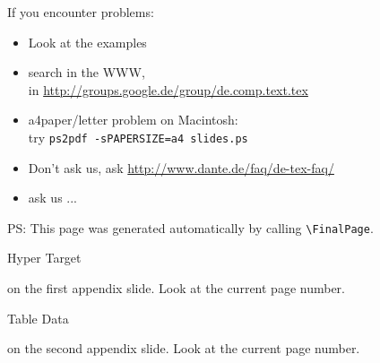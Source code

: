 \documentclass[11pt, a4paper, landscape]{article}
\begin{document}
\NewPage{} 
\begin{block}
  If you encounter problems:
  \begin{itemize}
  \item Look at the examples
  \item search in the WWW,\\ 
    \eg in \url{http://groups.google.de/group/de.comp.text.tex}
  \item a4paper/letter problem on Macintosh:\\ 
    try \texttt{ps2pdf -sPAPERSIZE=a4 slides.ps}
  \item Don't ask us, ask \url{http://www.dante.de/faq/de-tex-faq/}
  \item ask us ...
  \end{itemize}
\end{block}


\FinalPage
\vfill 
\centerline{\footnotesize PS: This page was generated automatically by calling
\texttt{\textbackslash FinalPage}.} 
\vfill


\NewPage



\appendix
\NewPage{}
\vfill
\hypertarget{anchorname}{Hyper Target} on the first appendix slide. 
Look at the current page number.
\vfill

\NewPage{}
\vfill
\hypertarget{table_data}{Table Data} on the second appendix slide.
Look at the current page number.
\vfill
\end{document}
